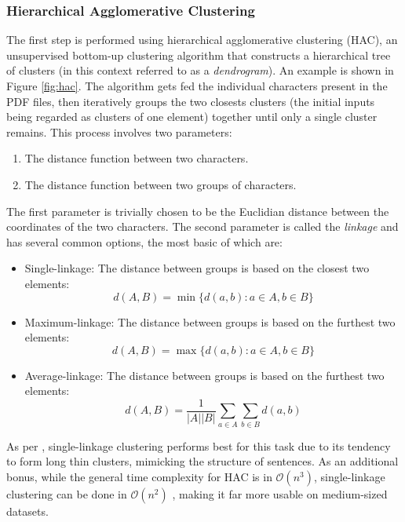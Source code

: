 \subsubsection*{Hierarchical Agglomerative Clustering}
The first step is performed using hierarchical agglomerative clustering (HAC),
an unsupervised bottom-up clustering algorithm that constructs a hierarchical
tree of clusters (in this context referred to as a \emph{dendrogram}). An
example is shown in Figure \ref{fig:hac}. The algorithm gets fed the individual
characters present in the PDF files, then iteratively groups the two closests
clusters (the initial inputs being regarded as clusters of one element) together
until only a single cluster remains. This process involves two parameters:
\begin{enumerate}
\item The distance function between two characters.
\item The distance function between two groups of characters.
\end{enumerate}
The first parameter is trivially chosen to be the Euclidian distance between the
coordinates of the two characters. The second parameter is called the
\emph{linkage} and has several common options, the most basic of which are:
\begin{itemize}
\item Single-linkage: The distance between groups is based on the closest two
  elements: \[ d(A, B) = \min \{ d(a, b) : a \in A, b \in B \} \]
\item Maximum-linkage: The distance between groups is based on the furthest two
  elements: \[ d(A, B) = \max \{ d(a, b) : a \in A, b \in B \} \]
\item Average-linkage: The distance between groups is based on the furthest two
  elements: \[ d(A, B) = \frac{1}{|A||B|} \sum_{a \in A}\sum_{b \in B} d(a, b) \]
\end{itemize}
As per \textcite{klampfl2014unsupervised}, single-linkage clustering performs
best for this task due to its tendency to form long thin clusters, mimicking the
structure of sentences. As an additional bonus, while the general time
complexity for HAC is in $\mathcal{O}(n^3)$, single-linkage clustering can be
done in $\mathcal{O}(n^2)$ \citep{sibson1973slink}, making it far more usable on
medium-sized datasets.

